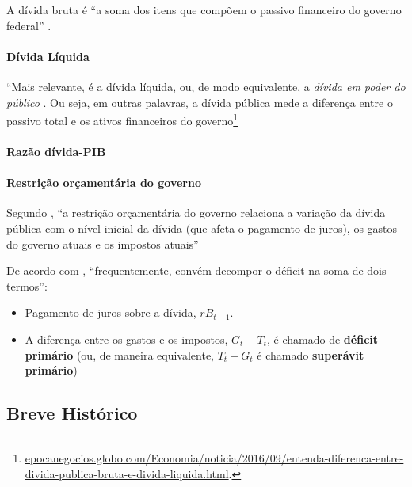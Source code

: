 \documentclass[]{article}
\providecommand{\tightlist}{%
  \setlength{\itemsep}{0pt}\setlength{\parskip}{0pt}}
\let\oldparagraph\paragraph
\renewcommand{\paragraph}[1]{\oldparagraph{#1}\mbox{}}
\let\rmarkdownfootnote\footnote%
\def\footnote{\protect\rmarkdownfootnote}
\begin{document}
A dívida bruta é ``a soma dos itens que compõem o passivo financeiro do
governo federal'' \cite[p.~537]{blanchard}.

\paragraph{Dívida Líquida}\label{divida-liquida}

``Mais relevante, é a dívida líquida, ou, de modo equivalente, a
\emph{dívida em poder do público} \cite[p.~537]{blanchard}. Ou seja, em
outras palavras, a dívida pública mede a diferença entre o passivo total
e os ativos financeiros do governo\footnote{\href{http://epocanegocios.globo.com/Economia/noticia/2016/09/entenda-diferenca-entre-divida-publica-bruta-e-divida-liquida.html}{epocanegocios.globo.com/Economia/noticia/2016/09/entenda-diferenca-entre-divida-publica-bruta-e-divida-liquida.html}.}

\paragraph{Razão dívida-PIB}\label{razao-divida-pib}

\paragraph{Restrição orçamentária do
governo}\label{restricao-orcamentaria-do-governo}

Segundo , ``a restrição orçamentária do
governo relaciona a variação da dívida pública com o nível inicial da
dívida (que afeta o pagamento de juros), os gastos do governo atuais e
os impostos atuais'' \cite[p.525]{blanchard}

De acordo com , ``frequentemente, convém
decompor o déficit na soma de dois termos'':

\begin{itemize}
\tightlist
\item
  Pagamento de juros sobre a dívida, \(rB_{t-1}\).
\item
  A diferença entre os gastos e os impostos, \(G_t - T_t\), é chamado de
  \textbf{déficit primário} (ou, de maneira equivalente, \(T_t - G_t\) é
  chamado \textbf{superávit primário})
\end{itemize}

\subsection{Breve Histórico}\label{breve-historico}
\end{document}
